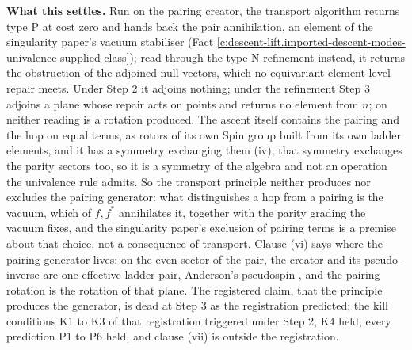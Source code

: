 \documentclass[11pt]{article}
\theoremstyle{definition}
\theoremstyle{plain}
\begin{document}
\label{c:note.descent-lift.setting-what-does-two-papers-what-3}
\textbf{What this settles.} Run on the pairing creator, the transport algorithm returns type P at cost zero and hands back the pair annihilation, an element of the singularity paper's vacuum stabiliser (Fact \ref{c:descent-lift.imported-descent-modes-univalence-supplied-class}); read through the type-N refinement instead, it returns the obstruction of the adjoined null vectors, which no equivariant element-level repair meets. Under Step 2 it adjoins nothing; under the refinement Step 3 adjoins a plane whose repair acts on points and returns no element from $n$; on neither reading is a rotation produced. The ascent itself contains the pairing and the hop on equal terms, as rotors of its own Spin group built from its own ladder elements, and it has a symmetry exchanging them (iv); that symmetry exchanges the parity sectors too, so it is a symmetry of the algebra and not an operation the univalence rule admits. So the transport principle neither produces nor excludes the pairing generator: what distinguishes a hop from a pairing is the vacuum, which of $f, f^{*}$ annihilates it, together with the parity grading the vacuum fixes, and the singularity paper's exclusion of pairing terms is a premise about that choice, not a consequence of transport. Clause (vi) says where the pairing generator lives: on the even sector of the pair, the creator and its pseudo-inverse are one effective ladder pair, Anderson's pseudospin \cite{Anderson1958}, and the pairing rotation is the rotation of that plane. The registered claim, that the principle produces the generator, is dead at Step 3 as the registration predicted; the kill conditions K1 to K3 of that registration triggered under Step 2, K4 held, every prediction P1 to P6 held, and clause (vii) is outside the registration.
\end{document}
